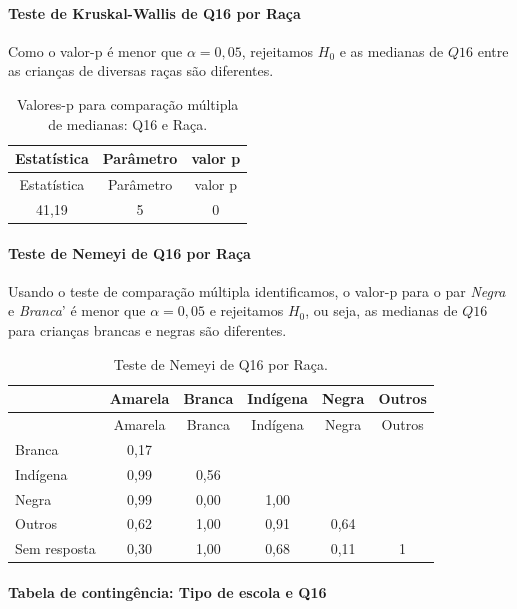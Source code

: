 \documentclass[]{article}
\let\oldparagraph\paragraph
\renewcommand{\paragraph}[1]{\oldparagraph{#1}\mbox{}}
\begin{document}
\hypertarget{teste-de-kruskal-wallis-de-q16-por-rauxe7a-1}{%
\paragraph{Teste de Kruskal-Wallis de Q16 por Raça}\label{teste-de-kruskal-wallis-de-q16-por-rauxe7a-1}}

Como o valor-p é menor que \(\alpha=0,05\), rejeitamos \(H_0\) e as medianas de \(Q16\) entre as crianças de diversas raças são diferentes.

\begin{longtable}[]{@{}ccc@{}}
\caption{\label{tab:unnamed-chunk-169}Valores-p para comparação múltipla de medianas: Q16 e Raça.}\tabularnewline
\toprule
Estatística & Parâmetro & valor p\tabularnewline
\midrule
\endfirsthead
\toprule
Estatística & Parâmetro & valor p\tabularnewline
\midrule
\endhead
41,19 & 5 & 0\tabularnewline
\bottomrule
\end{longtable}

\hypertarget{teste-de-nemeyi-de-q16-por-rauxe7a-1}{%
\paragraph{Teste de Nemeyi de Q16 por Raça}\label{teste-de-nemeyi-de-q16-por-rauxe7a-1}}

Usando o teste de comparação múltipla identificamos, o valor-p para o par \emph{Negra} e \emph{Branca}' é menor que \(\alpha=0,05\) e rejeitamos \(H_0\), ou seja, as medianas de \(Q16\) para crianças brancas e negras são diferentes.

\begin{longtable}[]{@{}lccccc@{}}
\caption{\label{tab:unnamed-chunk-170}Teste de Nemeyi de Q16 por Raça.}\tabularnewline
\toprule
& Amarela & Branca & Indígena & Negra & Outros\tabularnewline
\midrule
\endfirsthead
\toprule
& Amarela & Branca & Indígena & Negra & Outros\tabularnewline
\midrule
\endhead
Branca & 0,17 & & & &\tabularnewline
Indígena & 0,99 & 0,56 & & &\tabularnewline
Negra & 0,99 & 0,00 & 1,00 & &\tabularnewline
Outros & 0,62 & 1,00 & 0,91 & 0,64 &\tabularnewline
Sem resposta & 0,30 & 1,00 & 0,68 & 0,11 & 1\tabularnewline
\bottomrule
\end{longtable}

\cleardoublepage

\hypertarget{tabela-de-continguxeancia-tipo-de-escola-e-q16}{%
\paragraph{Tabela de contingência: Tipo de escola e Q16}\label{tabela-de-continguxeancia-tipo-de-escola-e-q16}}
\end{document}
